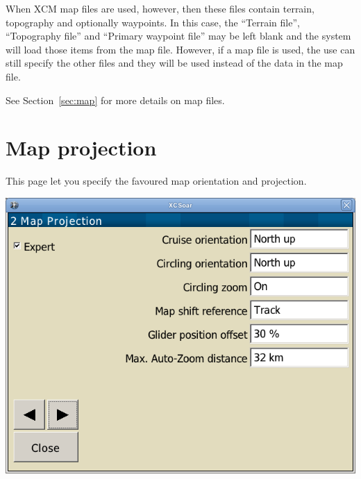 When XCM map files are used, however, then these files contain terrain, topography
and optionally waypoints.  In this case, the ``Terrain file'', ``Topography file'' and 
``Primary waypoint file'' may be left blank and the system will load those items
from the map file. However, if a map file is used, the use can still specify the other
files and they will be used instead of the data in the map file.

See Section~\ref{sec:map} for more details on map files.


\clearpage
\section{Map projection}\label{sec:map-projection}

This page let you specify the favoured map orientation and projection.

\begin{center}
\includegraphics[angle=0,width=0.8\linewidth,keepaspectratio='true']{figures/config-map_projection.png}
\end{center}

